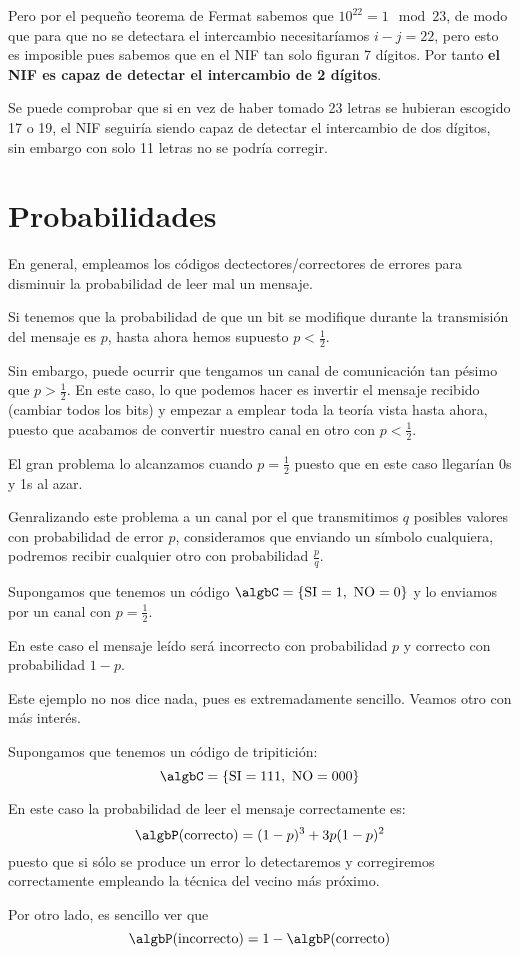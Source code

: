 Pero por el pequeño teorema de Fermat sabemos que $10^{22}=1 \mod 23$, de modo que para que no se detectara el intercambio necesitaríamos $i-j=22$, pero esto es imposible pues sabemos que en el NIF tan solo figuran 7 dígitos. Por tanto \textbf{el NIF es capaz de detectar el intercambio de 2 dígitos}.

\obs Se puede comprobar que si en vez de haber tomado 23 letras se hubieran escogido 17 o 19, el NIF seguiría siendo capaz de detectar el intercambio de dos dígitos, sin embargo con solo 11 letras no se podría corregir.

\section{Probabilidades}

En general, empleamos los códigos dectectores/correctores de errores para disminuir la probabilidad de leer mal un mensaje.

Si tenemos que la probabilidad de que un bit se modifique durante la transmisión del mensaje es $p$, hasta ahora hemos supuesto $p<\frac{1}{2}$.

Sin embargo, puede ocurrir que tengamos un canal de comunicación tan pésimo que $p>\frac{1}{2}$. En este caso, lo que podemos hacer es invertir el mensaje recibido (cambiar todos los bits) y empezar a emplear toda la teoría vista hasta ahora, puesto que acabamos de convertir nuestro canal en otro con $p<\frac{1}{2}$.

El gran problema lo alcanzamos cuando $p=\frac{1}{2}$ puesto que en este caso llegarían 0s y 1s al azar.

Genralizando este problema a un canal por el que transmitimos $q$ posibles valores con probabilidad de error $p$, consideramos que enviando un símbolo cualquiera, podremos recibir cualquier otro con probabilidad $\frac{p}{q}$.

\begin{example}
Supongamos que tenemos un código $\algbC = \{ \text{SI} = 1, \ \text{NO} = 0\}$ y lo enviamos por un canal con $p=\frac{1}{2}$.

En este caso el mensaje leído será incorrecto con probabilidad $p$ y correcto con probabilidad $1-p$.
\end{example}

Este ejemplo no nos dice nada, pues es extremadamente sencillo. Veamos otro con más interés.
\begin{example}
Supongamos que tenemos un código de tripitición:
\[\algbC = \{ \text{SI} = 111, \ \text{NO} = 000\}\]

En este caso la probabilidad de leer el mensaje correctamente es:
\[\algbP(\text{correcto})=(1-p)^3+3p(1-p)^2\]
puesto que si sólo se produce un error lo detectaremos y corregiremos correctamente empleando la técnica del vecino más próximo.

Por otro lado, es sencillo ver que
\[\algbP(\text{incorrecto}) = 1 - \algbP(\text{correcto})\]
\end{example}

